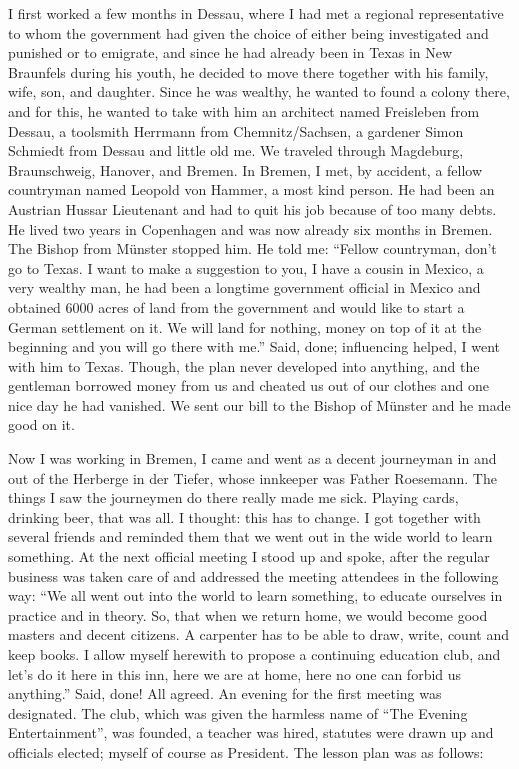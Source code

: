 I first worked a few months in Dessau, where I had met a regional representative to whom the government had given the choice of either being investigated and punished or to emigrate, and since he had already been in Texas in New Braunfels during his youth, he decided to move there together with his family, wife, son, and daughter. Since he was wealthy, he wanted to found a colony there, and for this, he wanted to take with him an architect named Freisleben from Dessau, a toolsmith Herrmann from Chemnitz/Sachsen, a gardener Simon Schmiedt from Dessau and little old me. We traveled through Magdeburg, Braunschweig, Hanover, and Bremen. In Bremen, I met, by accident, a fellow countryman named Leopold von Hammer, a most kind person. He had been an Austrian Hussar Lieutenant and had to quit his job because of too many debts. He lived two years in Copenhagen and was now already six months in Bremen. The Bishop from Münster stopped him. He told me: ``Fellow countryman, don't go to Texas. I want to make a suggestion to you, I have a cousin in Mexico, a very wealthy man, he had been a longtime government official in Mexico and obtained 6000 acres of land from the government and would like to start a German settlement on it. We will land for nothing, money on top of it at the beginning and you will go there with me.'' Said, done; influencing helped, I went with him to Texas. Though, the plan never developed into anything, and the gentleman borrowed money from us and cheated us out of our clothes and one nice day he had vanished. We sent our bill to the Bishop of Münster and he made good on it.

Now I was working in Bremen, I came and went as a decent journeyman in and out of the Herberge in der Tiefer, whose innkeeper was Father Roesemann. The things I saw the journeymen do there really made me sick. Playing cards, drinking beer, that was all. I thought: this has to change. I got together with several friends and reminded them that we went out in the wide world to learn something. At the next official meeting I stood up and spoke, after the regular business was taken care of and addressed the meeting attendees in the following way: ``We all went out into the world to learn something, to educate ourselves in practice and in theory. So, that when we return home, we would become good masters and decent citizens. A carpenter has to be able to draw, write, count and keep books. I allow myself herewith to propose a continuing education club, and let's do it here in this inn, here we are at home, here no one can forbid us anything.'' Said, done! All agreed. An evening for the first meeting was designated. The club, which was given the harmless name of ``The Evening Entertainment'', was founded, a teacher was hired, statutes were drawn up and officials elected; myself of course as President. The lesson plan was as follows:


